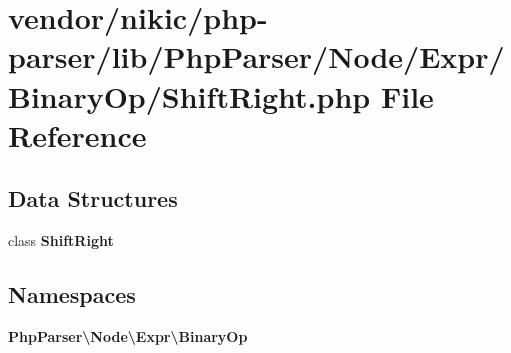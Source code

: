 \section{vendor/nikic/php-\/parser/lib/\+Php\+Parser/\+Node/\+Expr/\+Binary\+Op/\+Shift\+Right.php File Reference}
\label{_binary_op_2_shift_right_8php}
\subsection*{Data Structures}
\begin{DoxyCompactItemize}
\item 
class {\bf Shift\+Right}
\end{DoxyCompactItemize}
\subsection*{Namespaces}
\begin{DoxyCompactItemize}
\item 
 {\bf Php\+Parser\textbackslash{}\+Node\textbackslash{}\+Expr\textbackslash{}\+Binary\+Op}
\end{DoxyCompactItemize}
